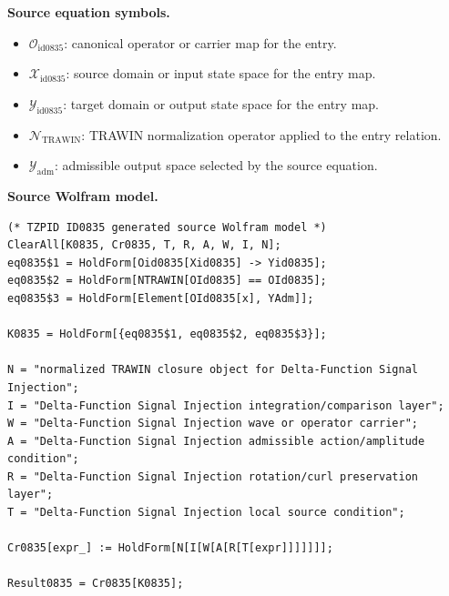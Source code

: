\begin{minipage}[t]{0.49\linewidth}
\begingroup
\small
\raggedright
\textbf{Source equation symbols.}\par
\begin{itemize}[leftmargin=1.35em,itemsep=1pt,topsep=1pt,parsep=0pt]
    \item $\mathcal{O}_{\mathrm{id0835}}$: canonical operator or carrier map for the entry.
    \item $\mathcal{X}_{\mathrm{id0835}}$: source domain or input state space for the entry map.
    \item $\mathcal{Y}_{\mathrm{id0835}}$: target domain or output state space for the entry map.
    \item $\mathcal{N}_{\mathrm{TRAWIN}}$: TRAWIN normalization operator applied to the entry relation.
    \item $\mathcal{Y}_{\mathrm{adm}}$: admissible output space selected by the source equation.
\end{itemize}
\endgroup
\end{minipage}\hfill
\begin{minipage}[t]{0.47\linewidth}
\begingroup
\scriptsize
\raggedright
\textbf{Source Wolfram model.}\par
\begin{Verbatim}[fontsize=\tiny,breaklines=true,breakanywhere=true]
(* TZPID ID0835 generated source Wolfram model *)
ClearAll[K0835, Cr0835, T, R, A, W, I, N];
eq0835$1 = HoldForm[Oid0835[Xid0835] -> Yid0835];
eq0835$2 = HoldForm[NTRAWIN[OId0835] == OId0835];
eq0835$3 = HoldForm[Element[OId0835[x], YAdm]];

K0835 = HoldForm[{eq0835$1, eq0835$2, eq0835$3}];

N = "normalized TRAWIN closure object for Delta-Function Signal Injection";
I = "Delta-Function Signal Injection integration/comparison layer";
W = "Delta-Function Signal Injection wave or operator carrier";
A = "Delta-Function Signal Injection admissible action/amplitude condition";
R = "Delta-Function Signal Injection rotation/curl preservation layer";
T = "Delta-Function Signal Injection local source condition";

Cr0835[expr_] := HoldForm[N[I[W[A[R[T[expr]]]]]]];

Result0835 = Cr0835[K0835];
\end{Verbatim}
\endgroup
\end{minipage}

